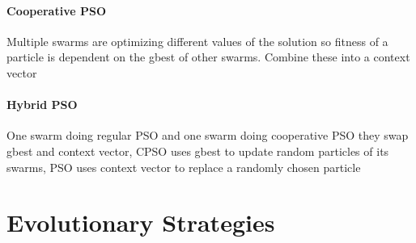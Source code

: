 \documentclass[12pt]{article}
\begin{document}
\paragraph{Cooperative PSO} 
\label{par:cooperative_pso}
Multiple swarms are optimizing different values of the solution so fitness of a particle is dependent on the gbest of other swarms. Combine these into a context vector

\paragraph{Hybrid PSO} 
\label{par:hybrid_pso}
One swarm doing regular PSO and one swarm doing cooperative PSO they swap gbest and context vector, CPSO uses gbest to update random particles of its swarms, PSO uses context vector to replace a randomly chosen particle

\section*{Evolutionary Strategies}
\label{sec:evolutionary_strategies}
\end{document}
